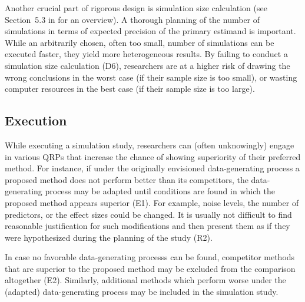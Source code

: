 \documentclass[a4paper, 11pt]{article}
\begin{document}
Another crucial part of rigorous design is simulation size calculation (see
Section~5.3 in \citet{Morris2019} for an overview). A thorough planning of the
number of simulations in terms of expected precision of the primary estimand is
important. While an arbitrarily chosen, often too small, number of simulations can be executed faster, they yield more heterogeneous results. By failing to
conduct a simulation size calculation (D6), researchers are at a higher risk
of drawing the wrong conclusions in the worst case 
(if their sample size is too small), or wasting
computer resources in the best case (if their sample size is too large).

\subsection{Execution}
While executing a simulation study, researchers can (often unknowingly) engage in 
various QRPs that increase the chance of showing superiority of their preferred method.
For instance, if under the originally envisioned data-generating process a proposed 
method does not perform better than its competitors, the data-generating process
may be adapted until conditions are found in which the proposed method appears superior (E1).
For example, noise levels, the number of predictors, or the effect sizes could be changed.
It is usually not difficult to find reasonable justification for such modifications and 
then present them as if they were hypothesized during the planning of the study (R2).

In case no favorable data-generating processs can be found,
competitor methods that are superior to the proposed method may be excluded 
from the comparison altogether (E2). Similarly, additional methods which
perform worse under the (adapted) data-generating process may be included in
the simulation study.
\end{document}
